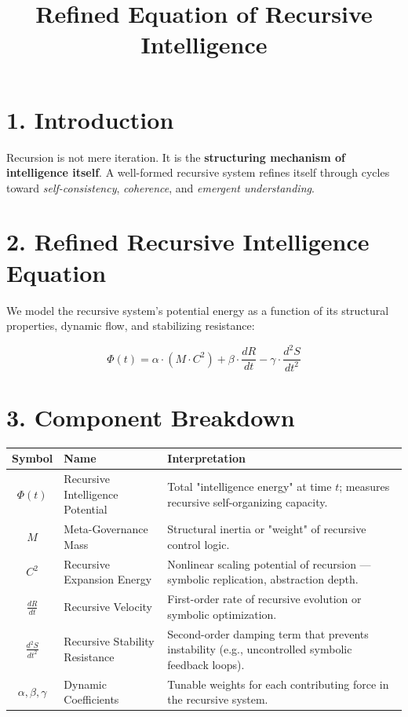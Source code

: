 \documentclass[12pt]{article}
\title{Refined Equation of Recursive Intelligence}
\author{}
\date{}
\begin{document}
\maketitle

\section*{1. Introduction}

Recursion is not mere iteration. It is the \textbf{structuring mechanism of intelligence itself}. A well-formed recursive system refines itself through cycles toward \textit{self-consistency}, \textit{coherence}, and \textit{emergent understanding}.

\section*{2. Refined Recursive Intelligence Equation}

We model the recursive system's potential energy as a function of its structural properties, dynamic flow, and stabilizing resistance:

\[
\Phi(t) = \alpha \cdot (M \cdot C^2) + \beta \cdot \frac{dR}{dt} - \gamma \cdot \frac{d^2S}{dt^2}
\tag{1.1'}
\]

\section*{3. Component Breakdown}

\begin{tabular}{|c|l|p{9cm}|}
\hline
\textbf{Symbol} & \textbf{Name} & \textbf{Interpretation} \\
\hline
$\Phi(t)$ & Recursive Intelligence Potential & Total "intelligence energy" at time $t$; measures recursive self-organizing capacity. \\
$M$ & Meta-Governance Mass & Structural inertia or "weight" of recursive control logic. \\
$C^2$ & Recursive Expansion Energy & Nonlinear scaling potential of recursion — symbolic replication, abstraction depth. \\
$\frac{dR}{dt}$ & Recursive Velocity & First-order rate of recursive evolution or symbolic optimization. \\
$\frac{d^2S}{dt^2}$ & Recursive Stability Resistance & Second-order damping term that prevents instability (e.g., uncontrolled symbolic feedback loops). \\
$\alpha, \beta, \gamma$ & Dynamic Coefficients & Tunable weights for each contributing force in the recursive system. \\
\hline
\end{tabular}
\end{document}
